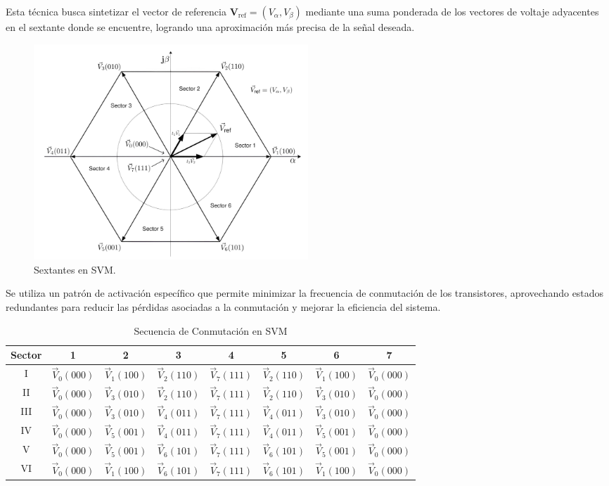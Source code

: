 \documentclass[11pt]{report}
\begin{document}
Esta técnica busca sintetizar el vector de referencia $\mathbf{V}_{\text{ref}}=(V_{\alpha},V_{\beta})$ mediante una suma ponderada de los vectores de voltaje adyacentes en el sextante donde se encuentre, logrando una aproximación más precisa de la señal deseada.

\begin{figure}[ht]
	\centering
	\includegraphics[width=0.5\textwidth]{imagenes/sectantes.png}
	\caption{Sextantes en SVM.}
\end{figure}
\FloatBarrier

Se utiliza un patrón de activación específico que permite minimizar la frecuencia de conmutación de los transistores, aprovechando estados redundantes para reducir las pérdidas asociadas a la conmutación y mejorar la eficiencia del sistema. \cite{power_conv_06}

\begin{table}[htbp]
	\centering
	\caption{Secuencia de Conmutación en SVM}
	\begin{tabular}{ c c c c c c c c }
		\hline
		\textbf{Sector} & \textbf{1}       & \textbf{2}       & \textbf{3}       & \textbf{4}       & \textbf{5}       & \textbf{6}       & \textbf{7}       \\
		\hline
		I               & $\vec{V}_0(000)$ & $\vec{V}_1(100)$ & $\vec{V}_2(110)$ & $\vec{V}_7(111)$ & $\vec{V}_2(110)$ & $\vec{V}_1(100)$ & $\vec{V}_0(000)$ \\
		II              & $\vec{V}_0(000)$ & $\vec{V}_3(010)$ & $\vec{V}_2(110)$ & $\vec{V}_7(111)$ & $\vec{V}_2(110)$ & $\vec{V}_3(010)$ & $\vec{V}_0(000)$ \\
		III             & $\vec{V}_0(000)$ & $\vec{V}_3(010)$ & $\vec{V}_4(011)$ & $\vec{V}_7(111)$ & $\vec{V}_4(011)$ & $\vec{V}_3(010)$ & $\vec{V}_0(000)$ \\
		IV              & $\vec{V}_0(000)$ & $\vec{V}_5(001)$ & $\vec{V}_4(011)$ & $\vec{V}_7(111)$ & $\vec{V}_4(011)$ & $\vec{V}_5(001)$ & $\vec{V}_0(000)$ \\
		V               & $\vec{V}_0(000)$ & $\vec{V}_5(001)$ & $\vec{V}_6(101)$ & $\vec{V}_7(111)$ & $\vec{V}_6(101)$ & $\vec{V}_5(001)$ & $\vec{V}_0(000)$ \\
		VI              & $\vec{V}_0(000)$ & $\vec{V}_1(100)$ & $\vec{V}_6(101)$ & $\vec{V}_7(111)$ & $\vec{V}_6(101)$ & $\vec{V}_1(100)$ & $\vec{V}_0(000)$ \\
		\hline
	\end{tabular}
\end{table}
\end{document}
